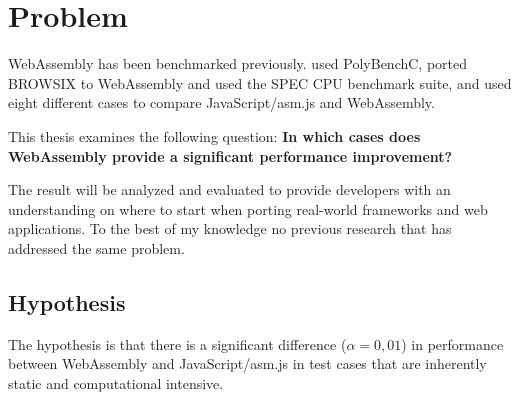 \section{Problem}
\label{problem}

WebAssembly has been benchmarked previously. \textcite{HaasRossbergSchuffTitzerHolmanGohmanWagnerZakaiBastien2017} used PolyBenchC, \textcite{JangdaPowersGuhaBerger2019} ported BROWSIX \parencite{PowersVilkBerger2017} to WebAssembly and used the SPEC CPU benchmark suite, and \textcite{ReiserBlaser2017} used eight different cases \parencite[Table 1 in][]{ReiserBlaser2017} to compare JavaScript/asm.js and WebAssembly.

This thesis examines the following question: \textbf{In which cases does WebAssembly provide a significant performance improvement?}

The result will be analyzed and evaluated to provide developers with an understanding on where to start when porting real-world frameworks and web applications. To the best of my knowledge no previous research that has addressed the same problem.

\subsection{Hypothesis}

The hypothesis is that there is a significant difference ($\alpha = 0,01$) in performance between WebAssembly and JavaScript/asm.js in test cases that are inherently static and computational intensive.
